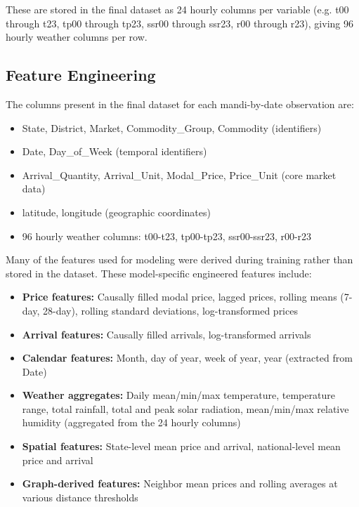\documentclass[conference]{IEEEtran}
\begin{document}
These are stored in the final dataset as 24 hourly columns per variable (e.g. t00 through t23, tp00 through tp23, ssr00 through ssr23, r00 through r23), giving 96 hourly weather columns per row.

\subsection{Feature Engineering}

The columns present in the final dataset for each mandi-by-date observation are:

\begin{itemize}
\item State, District, Market, Commodity\_Group, Commodity (identifiers)
\item Date, Day\_of\_Week (temporal identifiers)
\item Arrival\_Quantity, Arrival\_Unit, Modal\_Price, Price\_Unit (core market data)
\item latitude, longitude (geographic coordinates)
\item 96 hourly weather columns: t00-t23, tp00-tp23, ssr00-ssr23, r00-r23
\end{itemize}

Many of the features used for modeling were derived during training rather than stored in the dataset. These model-specific engineered features include:

\begin{itemize}
\item \textbf{Price features:} Causally filled modal price, lagged prices, rolling means (7-day, 28-day), rolling standard deviations, log-transformed prices
\item \textbf{Arrival features:} Causally filled arrivals, log-transformed arrivals
\item \textbf{Calendar features:} Month, day of year, week of year, year (extracted from Date)
\item \textbf{Weather aggregates:} Daily mean/min/max temperature, temperature range, total rainfall, total and peak solar radiation, mean/min/max relative humidity (aggregated from the 24 hourly columns)
\item \textbf{Spatial features:} State-level mean price and arrival, national-level mean price and arrival
\item \textbf{Graph-derived features:} Neighbor mean prices and rolling averages at various distance thresholds
\end{itemize}
\end{document}
